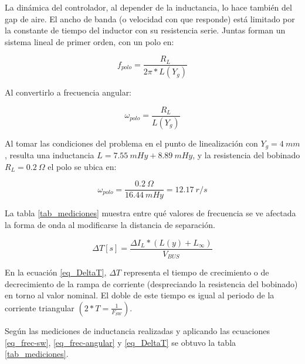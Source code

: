 \noindent La dinámica del controlador, al depender de la inductancia, lo hace también del gap de aire. El ancho de banda (o velocidad con que responde) está limitado por la constante de tiempo del inductor con su resistencia serie. Juntas forman un sistema lineal de primer orden, con un polo en: 

\begin{equation} 
	f_{polo} = \frac{R_L}{2\pi * L(Y_g)}
\end{equation}

\noindent Al convertirlo a frecuencia angular:

\begin{equation} \label{eq_frec-angular}
	\omega _{polo} = \frac{R_L}{L(Y_g)}
\end{equation}

\noindent Al tomar las condiciones del problema en el punto de linealización con $Y_{g}=4\: mm$, resulta una inductancia $L = 7.55 \:mHy + 8.89 \: mHy$, y la resistencia del bobinado $R_L=0.2\:\Omega$ el polo se ubica en:

\begin{equation} 
	\omega _{polo} = \frac{0.2\:\Omega}{16.44 \:mHy} = 12.17 \:r/s
\end{equation}

\noindent La tabla \ref{tab_mediciones} muestra  entre qué valores de frecuencia se ve afectada la forma de onda al modificarse la distancia de separación.

\begin{equation} \label{eq_DeltaT}
	\Delta T [s] = \frac{\Delta I_L * (L(y) + L_{\infty})}{V_{BUS}}
\end{equation}

\noindent En la ecuación \ref{eq_DeltaT}, $\Delta T$ representa el tiempo de crecimiento o de decrecimiento de la rampa de corriente (despreciando la resistencia del bobinado) en torno al valor nominal. El doble de este tiempo es igual al periodo de la corriente triangular $(2*T=\frac{1}{F_{SW}})$.

\noindent Según las mediciones de inductancia realizadas y aplicando las ecuaciones \ref{eq_frec-sw}, \ref{eq_frec-angular} y \ref{eq_DeltaT} se obtuvo la tabla \ref{tab_mediciones}.


